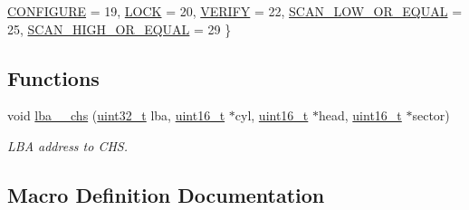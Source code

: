 \begin{DoxyCompactItemize}
\hyperlink{a00017_a9990a5de334fdaec2ce93b74b8676148_a9990a5de334fdaec2ce93b74b8676148a5183723f609e1521f38450e9792af61d}{C\+O\+N\+F\+I\+G\+U\+RE} = 19, 
\hyperlink{a00017_a9990a5de334fdaec2ce93b74b8676148_a9990a5de334fdaec2ce93b74b8676148a438b68412f24003b09e0993b62dc7b48}{L\+O\+CK} = 20, 
\hyperlink{a00017_a9990a5de334fdaec2ce93b74b8676148_a9990a5de334fdaec2ce93b74b8676148a570b000ad5bd233482644aaaac095680}{V\+E\+R\+I\+FY} = 22, 
\hyperlink{a00017_a9990a5de334fdaec2ce93b74b8676148_a9990a5de334fdaec2ce93b74b8676148a7eefaec5fabe1db94fd12a84af66b6cd}{S\+C\+A\+N\+\_\+\+L\+O\+W\+\_\+\+O\+R\+\_\+\+E\+Q\+U\+AL} = 25, 
\newline
\hyperlink{a00017_a9990a5de334fdaec2ce93b74b8676148_a9990a5de334fdaec2ce93b74b8676148a1ee024a89ac2dbd7845f63306f175546}{S\+C\+A\+N\+\_\+\+H\+I\+G\+H\+\_\+\+O\+R\+\_\+\+E\+Q\+U\+AL} = 29
 \}
\end{DoxyCompactItemize}
\subsection*{Functions}
\begin{DoxyCompactItemize}
\item 
void \hyperlink{a00017_a782ff57a4ec7786197ec3a12d4f52332_a782ff57a4ec7786197ec3a12d4f52332}{lba\+\_\+\_\+chs} (\hyperlink{a00038_a435d1572bf3f880d55459d9805097f62_a435d1572bf3f880d55459d9805097f62}{uint32\+\_\+t} lba, \hyperlink{a00038_adf4d876453337156dde61095e1f20223_adf4d876453337156dde61095e1f20223}{uint16\+\_\+t} $\ast$cyl, \hyperlink{a00038_adf4d876453337156dde61095e1f20223_adf4d876453337156dde61095e1f20223}{uint16\+\_\+t} $\ast$head, \hyperlink{a00038_adf4d876453337156dde61095e1f20223_adf4d876453337156dde61095e1f20223}{uint16\+\_\+t} $\ast$sector)
\begin{DoxyCompactList}\small\item\em L\+BA address to C\+HS. \end{DoxyCompactList}\end{DoxyCompactItemize}


\subsection{Macro Definition Documentation}
\mbox{\label{a00017_a04d40064bde801f12fb73134cf328150_a04d40064bde801f12fb73134cf328150}} 
